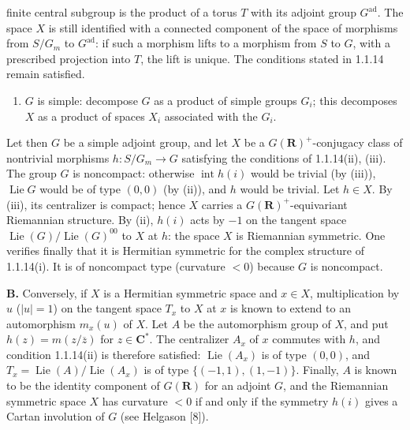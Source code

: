 \documentclass[10pt,a4paper]{article}
\providecommand{\tightlist}{\setlength{\itemsep}{0pt}\setlength{\parskip}{0pt}}
\newcommand{\SourcePage}[2]{\clearpage\setcounter{page}{#2}\typeout{D031_SOURCE_PAGE physical=#1 printed=#2}}
\begin{document}
\SourcePage{10}{256}
finite central subgroup is the product of a torus \(T\) with its adjoint group \(G^{\mathrm{ad}}\). The space \(X\) is still identified with a connected component of the space of morphisms from \(S/G_m\) to \(G^{\mathrm{ad}}\): if such a morphism lifts to a morphism from \(S\) to \(G\), with a prescribed projection into \(T\), the lift is unique. The conditions stated in 1.1.14 remain satisfied.

\begin{enumerate}
\def\labelenumi{(\arabic{enumi})}
\setcounter{enumi}{2}
\tightlist
\item
  \(G\) is simple: decompose \(G\) as a product of simple groups \(G_i\); this decomposes \(X\) as a product of spaces \(X_i\) associated with the \(G_i\).
\end{enumerate}

Let then \(G\) be a simple adjoint group, and let \(X\) be a \(G(\mathbf R)^+\)-conjugacy class of nontrivial morphisms \(h:S/G_m\to G\) satisfying the conditions of 1.1.14(ii), (iii). The group \(G\) is noncompact: otherwise \(\operatorname{int}h(i)\) would be trivial (by (iii)), \(\operatorname{Lie}G\) would be of type \((0,0)\) (by (ii)), and \(h\) would be trivial. Let \(h\in X\). By (iii), its centralizer is compact; hence \(X\) carries a \(G(\mathbf R)^+\)-equivariant Riemannian structure. By (ii), \(h(i)\) acts by \(-1\) on the tangent space \(\operatorname{Lie}(G)/\operatorname{Lie}(G)^{00}\) to \(X\) at \(h\): the space \(X\) is Riemannian symmetric. One verifies finally that it is Hermitian symmetric for the complex structure of 1.1.14(i). It is of noncompact type (curvature \(<0\)) because \(G\) is noncompact.

\textbf{B.} Conversely, if \(X\) is a Hermitian symmetric space and \(x\in X\), multiplication by \(u\) (\(|u|=1\)) on the tangent space \(T_x\) to \(X\) at \(x\) is known to extend to an automorphism \(m_x(u)\) of \(X\). Let \(A\) be the automorphism group of \(X\), and put \(h(z)=m(z/\overline z)\) for \(z\in\mathbf C^*\). The centralizer \(A_x\) of \(x\) commutes with \(h\), and condition 1.1.14(ii) is therefore satisfied: \(\operatorname{Lie}(A_x)\) is of type \((0,0)\), and \(T_x=\operatorname{Lie}(A)/\operatorname{Lie}(A_x)\) is of type \(\{(-1,1),(1,-1)\}\). Finally, \(A\) is known to be the identity component of \(G(\mathbf R)\) for an adjoint \(G\), and the Riemannian symmetric space \(X\) has curvature \(<0\) if and only if the symmetry \(h(i)\) gives a Cartan involution of \(G\) (see Helgason {[}8{]}).
\end{document}
